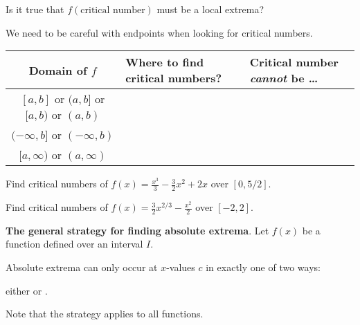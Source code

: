 \documentclass[../main.tex]{subfiles}
\begin{document}
\begin{exercise} \label{ex:critical-number-is-candidate}
  Is it true that \(f(\text{critical number})\) must be a local extrema?

  \begin{center}
    
    \hfill
    
    \hfill
    
    \hfill
    
  \end{center}
\end{exercise}
\clearpage

We need to be careful with endpoints when looking for critical numbers.
\begin{center}
  \begin{tabular}{c|l|l}
    Domain of \(f\) & Where to find critical numbers? & Critical number \emph{cannot} be \ldots{} \\\midrule
    \([a,b]\) or \((a,b]\) or \([a,b)\) or \((a,b)\) & & \\[1ex]\midrule
    \((-\infty, b]\) or \((-\infty, b)\) & & \\[1ex]\midrule
    \([a, \infty)\) or \((a, \infty)\) & & \\[1ex]\midrule
  \end{tabular}
\end{center}

\begin{example} \label{ex:critical-number-polynomial}
  Find critical numbers of \(f(x) = \frac{x^{3}}{3} - \frac{3}{2}x^{2} + 2x\) over \([0, 5/2]\).

\end{example}

%

\begin{example} \label{ex:critical-number-rational}
  Find critical numbers of \(f(x) = \frac{3}{2} x^{2/3} - \frac{x^{2}}{2}\) over \([-2,2]\). 

\end{example}

\clearpage


\begin{mdframed}[style=simple-compact]
  \textbf{The general strategy for finding absolute extrema}. Let \(f(x)\) be a function defined over an interval \(I\).

  Absolute extrema can only occur at \(x\)-values \(c\) in exactly one of two ways:
  \begin{center}
    either \underline{\hspace{2in}} or \underline{\hspace{2in}}.
  \end{center}
  
  Note that the strategy applies to all functions.
\end{mdframed}
\end{document}
